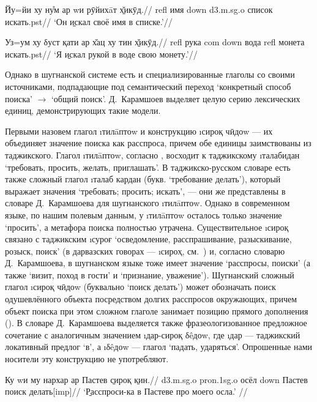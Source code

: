 \begingl
\gla Йу=йи ху ну̊м ар wи рӯйихāт \b{х̌икӯд}.//
 {\sc refl} имя {\sc down} {\sc d3.m.sg.o} список искать.{\sc pst}//
\glft ‘Он \b{искал} своё имя в списке.’//
\endgl \xe

\begingl
\gla Уз=ум ху δуст қати ар х̌ац ху тин \b{х̌икӯд}.//
 {\sc refl} рука {\sc com} {\sc down} вода {\sc refl} монета искать.{\sc pst}//
\glft ‘Я \b{искал} рукой в воде свою монету.’//
\endgl \xe

Однако в шугнанской системе есть и специализированные глаголы со своими источниками, подпадающие под семантический переход ‘конкретный способ поиска’ $\rightarrow$ ‘общий поиск’. Д.~Карамшоев выделяет целую серию лексических единиц, демонстрирующих такие модели.

Первыми назовем глагол \i{тилāптоw} и конструкцию \i{сироқ чӣдоw} — их объединяет значение поиска как расспроса, причем обе единицы заимствованы из таджикского. Глагол \i{тилāптоw}, согласно \parencite[138]{dodykhudoeva1988}, восходит к таджикскому \i{талабидан} ‘требовать, просить, желать, приглашать’. В таджикско-русском словаре \parencite{saymiddinov_etal2006} есть также сложный глагол \i{талаб кардан} (букв. ‘требование делать’), который выражает значения ‘требовать; просить; искать’, — они же представлены в словаре Д.~Карамшоева для шугнанского \i{тилāптоw}. Однако в современном языке, по нашим полевым данным, у \i{тилāптоw} осталось только значение ‘просить’, а метафора поиска полностью утрачена. Существительное \i{сироқ} связано с таджикским \i{суроғ} ‘осведомление, расспрашивание, разыскивание, розыск, поиск’ (в дарвазских говорах — \i{сироҳ}, см.~\parencite[269]{rozenfeld1956}) и, согласно словарю Д.~Карамшоева, в шугнанском языке тоже имеет значение ‘расспросы, поиски’ (а также ‘визит, поход в гости’ и ‘признание, уважение’). Шугнанский сложный глагол \i{сироқ чӣдоw} (буквально ‘поиск делать’) может обозначать поиск одушевлённого объекта посредством долгих расспросов окружающих, причем объект поиска при этом сложном глаголе занимает позицию прямого дополнения (). В словаре Д.~Карамшоева выделяется также фразеологизованное предложное сочетание с аналогичным значением \i{дар-сироқ δêдоw}, где \i{дар} — таджикский локативный предлог ‘в’, а \i{δêдоw} — глагол ‘падать, ударяться’. Опрошенные нами носители эту конструкцию не употребляют.

\begingl
\gla Ку wи му нархар ар Пастев \b{сироқ} \b{кин}.//
 {\sc d3.m.sg.o} {\sc pron.1sg.o} осёл {\sc down} Пастев поиск делать[{\sc imp}]//
\glft ‘\b{Расспроси}-ка в Пастеве про моего осла.’ //
\endgl \xe

